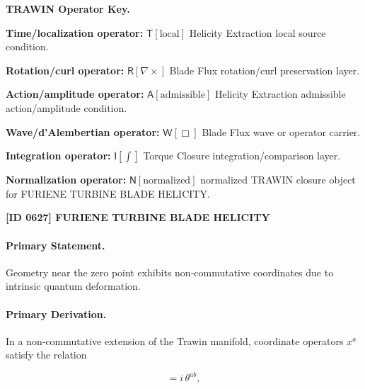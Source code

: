\par\vspace{0.45\baselineskip}
\noindent\begin{minipage}[t]{\linewidth}
\begingroup
\small
\raggedright
\textbf{TRAWIN Operator Key.}\par
\noindent\textbf{Time/localization operator:} $\mathsf{T}\!\left[\mathrm{local}\right]$ Helicity Extraction local source condition.\par
\noindent\textbf{Rotation/curl operator:} $\mathsf{R}\!\left[\nabla\times\right]$ Blade Flux rotation/curl preservation layer.\par
\noindent\textbf{Action/amplitude operator:} $\mathsf{A}\!\left[\mathrm{admissible}\right]$ Helicity Extraction admissible action/amplitude condition.\par
\noindent\textbf{Wave/d'Alembertian operator:} $\mathsf{W}\!\left[\Box\right]$ Blade Flux wave or operator carrier.\par
\noindent\textbf{Integration operator:} $\mathsf{I}\!\left[\int\right]$ Torque Closure integration/comparison layer.\par
\noindent\textbf{Normalization operator:} $\mathsf{N}\!\left[\mathrm{normalized}\right]$ normalized TRAWIN closure object for FURIENE TURBINE BLADE HELICITY.\par
\endgroup
\end{minipage}

\clearpage
\noindent\textbf{[ID 0627] FURIENE TURBINE BLADE HELICITY}\par
\vspace{0.35em}
\paragraph{Primary Statement.}

Geometry near the zero point exhibits non‑commutative coordinates due to intrinsic quantum deformation.

\paragraph{Primary Derivation.}

In a non‑commutative extension of the Trawin manifold, coordinate operators $x^a$ satisfy the relation

\begin{equation}
[ x^a , x^b ] = i\,\theta^{ab},
\end{equation}

